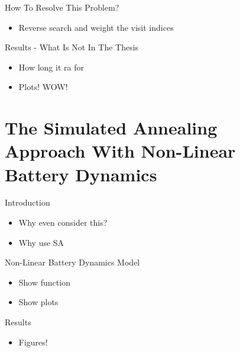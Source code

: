 \documentclass[bigger]{beamer}
\begin{document}
\begin{frame}[label={sec:org9f4a0a2}]{How To Resolve This Problem?}
\begin{itemize}
\item Reverse search and weight the visit indices
\end{itemize}
\end{frame}
\begin{frame}[label={sec:org57c2e71}]{Results - What Is Not In The Thesis}
\begin{itemize}
\item How long it ra for
\item Plots! WOW!
\end{itemize}
\end{frame}
\section{The Simulated Annealing Approach With Non-Linear Battery Dynamics}
\label{sec:org2d768b3}
\begin{frame}[label={sec:orgb1aa547}]{Introduction}
\begin{itemize}
\item Why even consider this?
\item Why use SA
\end{itemize}
\end{frame}
\begin{frame}[label={sec:orga09244c}]{Non-Linear Battery Dynamics Model}
\begin{itemize}
\item Show function
\item Show plots
\end{itemize}
\end{frame}
\begin{frame}[label={sec:org6e53342}]{Results}
\begin{itemize}
\item Figures!
\end{itemize}
\end{frame}
\end{document}
